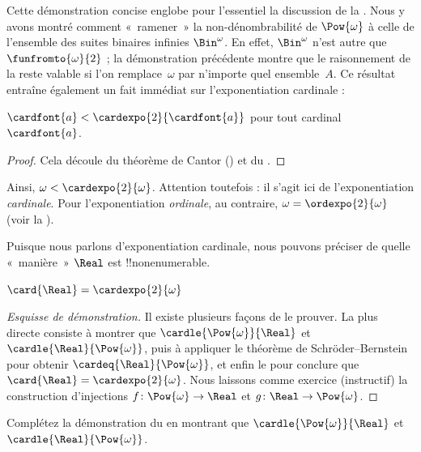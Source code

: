 \documentclass[../../../include/open-logic-section]{subfiles}
\begin{document}
Cette démonstration concise englobe pour l'essentiel
la discussion de la .
Nous y avons montré comment «~ramener~» la
non-dénombrabilité de $\Pow{\omega}$ à celle de
l'ensemble des suites binaires infinies
$\Bin^\omega$. En effet, $\Bin^{\omega}$
n'est autre que $\funfromto{\omega}{2}$ ;
la démonstration précédente montre que le
raisonnement de la 
reste valable si l'on remplace~$\omega$
par n'importe quel ensemble~$A$.
Ce résultat entraîne également un fait immédiat
sur l'exponentiation cardinale :

\begin{cor}
$\cardfont{a} < \cardexpo{2}{\cardfont{a}}$
pour tout cardinal~$\cardfont{a}$.
\end{cor}

\begin{proof}
Cela découle du théorème de Cantor
() et du
.
\end{proof}
\noindent
Ainsi, $\omega < \cardexpo{2}{\omega}$.
Attention toutefois : il s'agit ici de
l'exponentiation \emph{cardinale}. Pour
l'exponentiation \emph{ordinale}, au contraire,
$\omega = \ordexpo{2}{\omega}$
(voir la ).

Puisque nous parlons d'exponentiation cardinale,
nous pouvons préciser de quelle «~manière~»
$\Real$ est !!{nonenumerable}.

\begin{thm}
$\card{\Real} = \cardexpo{2}{\omega}$
\end{thm}

\begin{proof}[Esquisse de démonstration]
Il existe plusieurs façons de le prouver. La plus
directe consiste à montrer que
$\cardle{\Pow{\omega}}{\Real}$ et
$\cardle{\Real}{\Pow{\omega}}$, puis à appliquer
le théorème de Schröder--Bernstein pour obtenir
$\cardeq{\Real}{\Pow{\omega}}$, et enfin
le 
pour conclure que
$\card{\Real} = \cardexpo{2}{\omega}$.
Nous laissons comme exercice (instructif) la
construction d'injections
$f \colon \Pow{\omega} \to \Real$
et $g \colon \Real \to \Pow{\omega}$.
\end{proof}

\begin{prob}
Complétez la démonstration du
en montrant que
$\cardle{\Pow{\omega}}{\Real}$ et
$\cardle{\Real}{\Pow{\omega}}$.
\end{prob}
\end{document}
